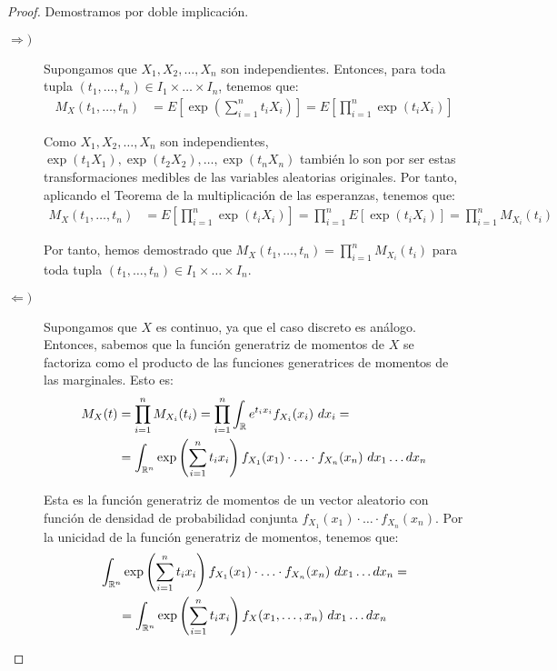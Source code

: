 \begin{proof}
    Demostramos por doble implicación.
    \begin{description}
        \item[$\Longrightarrow)$] Supongamos que $X_1,X_2,\ldots,X_n$ son independientes. Entonces, para toda tupla $(t_1, \ldots, t_n) \in I_1 \times \ldots \times I_n$, tenemos que:
        \begin{align*}
            M_X(t_1, \ldots, t_n) &= E\left[\exp\left(\sum_{i=1}^n t_iX_i\right)\right]
            = E\left[\prod_{i=1}^n \exp(t_iX_i)\right]
        \end{align*}

        Como $X_1,X_2,\ldots,X_n$ son independientes, $\exp(t_1X_1),\exp(t_2X_2),\ldots,\exp(t_nX_n)$ también lo son por ser estas transformaciones medibles de las variables aleatorias originales. Por tanto, aplicando el Teorema de la multiplicación de las esperanzas, tenemos que:
        \begin{align*}
            M_X(t_1, \ldots, t_n) &= E\left[\prod_{i=1}^n \exp(t_iX_i)\right]
            = \prod_{i=1}^n E[\exp(t_iX_i)]
            = \prod_{i=1}^n M_{X_i}(t_i)
        \end{align*}

        Por tanto, hemos demostrado que $M_X(t_1, \ldots, t_n) = \prod\limits_{i=1}^n M_{X_i}(t_i)$ para toda tupla $(t_1, \ldots, t_n) \in I_1 \times \ldots \times I_n$.

        \item[$\Longleftarrow)$] Supongamos que $X$ es continuo, ya que el caso discreto es análogo. Entonces, sabemos que la función generatriz de momentos de $X$ se factoriza como el producto de las funciones generatrices de momentos de las marginales. Esto es:
        \begin{align*}
            M_X(t) &= \prod_{i=1}^n M_{X_i}(t_i)
            = \prod_{i=1}^n \int_{\bb{R}} e^{t_i x_i} f_{X_i}(x_i) \ dx_i
            =\\&= \int_{\bb{R}^n} \exp\left(\sum_{i=1}^n t_i x_i\right) f_{X_1}(x_1) \cdot \ldots \cdot f_{X_n}(x_n) \ dx_1 \dots dx_n
        \end{align*}
        
        Esta es la función generatriz de momentos de un vector aleatorio con función de densidad de probabilidad conjunta $f_{X_1}(x_1) \cdot \ldots \cdot f_{X_n}(x_n)$. Por la unicidad de la función generatriz de momentos, tenemos que:
        \begin{multline*}
            \int_{\mathbb{R}^n} \exp\left(\sum_{i=1}^n t_i x_i\right) f_{X_1}(x_1) \cdot \ldots \cdot f_{X_n}(x_n) \ dx_1 \dots dx_n =\\= \int_{\mathbb{R}^n} \exp\left(\sum_{i=1}^n t_i x_i\right) f_X(x_1, \ldots, x_n) \ dx_1 \dots dx_n
        \end{multline*}


\end{description}
\end{proof}
